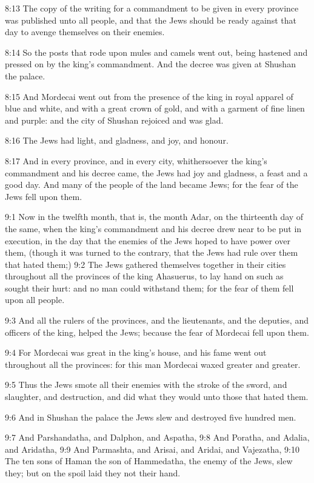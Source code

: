8:13 The copy of the writing for a commandment to be given in every province was published unto all people, and that the Jews should be ready against that day to avenge themselves on their enemies.

8:14 So the posts that rode upon mules and camels went out, being hastened and pressed on by the king's commandment. And the decree was given at Shushan the palace.

8:15 And Mordecai went out from the presence of the king in royal apparel of blue and white, and with a great crown of gold, and with a garment of fine linen and purple: and the city of Shushan rejoiced and was glad.

8:16 The Jews had light, and gladness, and joy, and honour.

8:17 And in every province, and in every city, whithersoever the king's commandment and his decree came, the Jews had joy and gladness, a feast and a good day. And many of the people of the land became Jews; for the fear of the Jews fell upon them.

9:1 Now in the twelfth month, that is, the month Adar, on the thirteenth day of the same, when the king's commandment and his decree drew near to be put in execution, in the day that the enemies of the Jews hoped to have power over them, (though it was turned to the contrary, that the Jews had rule over them that hated them;) 9:2 The Jews gathered themselves together in their cities throughout all the provinces of the king Ahasuerus, to lay hand on such as sought their hurt: and no man could withstand them; for the fear of them fell upon all people.

9:3 And all the rulers of the provinces, and the lieutenants, and the deputies, and officers of the king, helped the Jews; because the fear of Mordecai fell upon them.

9:4 For Mordecai was great in the king's house, and his fame went out throughout all the provinces: for this man Mordecai waxed greater and greater.

9:5 Thus the Jews smote all their enemies with the stroke of the sword, and slaughter, and destruction, and did what they would unto those that hated them.

9:6 And in Shushan the palace the Jews slew and destroyed five hundred men.

9:7 And Parshandatha, and Dalphon, and Aspatha, 9:8 And Poratha, and Adalia, and Aridatha, 9:9 And Parmashta, and Arisai, and Aridai, and Vajezatha, 9:10 The ten sons of Haman the son of Hammedatha, the enemy of the Jews, slew they; but on the spoil laid they not their hand.

